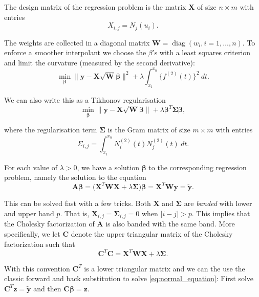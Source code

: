\documentclass[a4paper]{scrartcl}
\newcommand{\vv}[1]{\ensuremath{\bm{#1}}}
\newcommand{\mat}[1]{\ensuremath{\bm{#1}}}
\newcommand{\T}[1]{\ensuremath{{#1}^{T}}}
\newcommand\dd{\ensuremath{\:d}}
\DeclareMathOperator\diag{diag}
\begin{document}
The design matrix of the regression problem is the matrix $\mat X$ of size $n\times m$ with entries
\begin{equation*}
    X_{i,j} = N_j(u_i).
\end{equation*}

The weights are collected in a diagonal matrix $\mat W = \diag(w_i, i = 1, \ldots, n)$.
To enforce a smoother interpolant we choose the $\beta$'s with a least squares criterion and limit the curvature (measured by the second derivative):
\begin{equation*}
    \min_{\vv \beta} \|\vv y - \mat X \sqrt{\mat W} \vv \beta\|^2 + \lambda \int_{x_1}^{x_n} \bigl\{f^{(2)}(t)\bigr\}^2 \dd t.
\end{equation*}

We can also write this as a Tikhonov regularisation
\begin{equation*}
    \min_{\vv \beta} \|\vv y - \mat X \sqrt{\mat W} \vv \beta\| + \lambda \T{\vv\beta} \mat\Sigma \vv\beta,
\end{equation*}

where the regularisation term $\mat\Sigma$ is the Gram matrix of size $m\times m$ with entries
\begin{equation*}
    \Sigma_{i,j} =
    \int_{x_1}^{x_n} N_i^{(2)}(t) N_j^{(2)}(t) \dd t.
\end{equation*}

For each value of $\lambda > 0$, we have a solution $\vv\beta$ to the corresponding regression problem, namely the solution to the equation
\begin{equation}
    \label{eq:normal_equation}
    \mat A \vv \beta
    = \bigl(\T{\mat X} \mat W \mat X + \lambda \mat\Sigma\bigr) \vv\beta
    = \T{\mat X} \mat W \vv y 
    = \widetilde{\vv y}.
\end{equation}

This can be solved fast with a few tricks.
Both $\mat X$ and $\mat\Sigma$ are \textit{banded} with lower and upper band $p$.
That is, $\mat X_{i,j} = \mat\Sigma_{i,j} = 0$ when $|i - j| > p$.
This implies that the Cholesky factorization of $\mat A$ is also banded with the same band.
More specifically, we let $\mat C$ denote the upper triangular matrix of the Cholesky factorization such that 
\begin{equation*}
    \T{\mat C} \mat C = \T{\mat X} \mat W \mat X + \lambda \mat\Sigma.
\end{equation*}

With this convention $\T{\mat C}$ is a lower triangular matrix and we can the use the classic forward and back substitution to solve \cref{eq:normal_equation}:
First solve $\T{\mat C} \vv z = \widetilde{\vv y}$ and then $\mat C \vv \beta = \vv z$.
\end{document}
